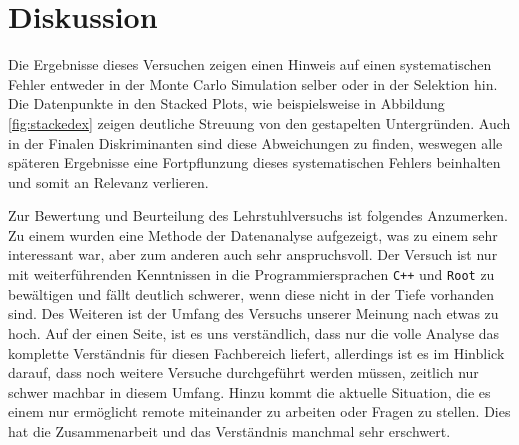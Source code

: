 \section{Diskussion}

Die Ergebnisse dieses Versuchen zeigen einen Hinweis auf einen systematischen Fehler
entweder in der Monte Carlo Simulation selber oder in der Selektion hin. Die Datenpunkte
in den Stacked Plots, wie beispielsweise in Abbildung \ref{fig:stackedex} zeigen deutliche
Streuung von den gestapelten Untergründen. Auch in der Finalen Diskriminanten sind diese
Abweichungen zu finden, weswegen alle späteren Ergebnisse eine Fortpflunzung dieses
systematischen Fehlers beinhalten und somit an Relevanz verlieren. \par

Zur Bewertung und Beurteilung des Lehrstuhlversuchs ist folgendes Anzumerken. Zu einem
wurden eine Methode der Datenanalyse aufgezeigt, was zu einem sehr interessant war, aber
zum anderen auch sehr anspruchsvoll. Der Versuch ist nur mit weiterführenden Kenntnissen
in die Programmiersprachen \texttt{C++} und \texttt{Root} zu bewältigen und fällt deutlich
schwerer, wenn diese nicht in der Tiefe vorhanden sind. Des Weiteren ist der Umfang des
Versuchs unserer Meinung nach etwas zu hoch. Auf der einen Seite, ist es uns verständlich,
dass nur die volle Analyse das komplette Verständnis für diesen Fachbereich liefert,
allerdings ist es im Hinblick darauf, dass noch weitere Versuche durchgeführt werden
müssen, zeitlich nur schwer machbar in diesem Umfang.
Hinzu kommt die aktuelle Situation, die es einem nur ermöglicht remote miteinander zu arbeiten oder Fragen zu stellen.
Dies hat die Zusammenarbeit und das Verständnis manchmal sehr erschwert.
